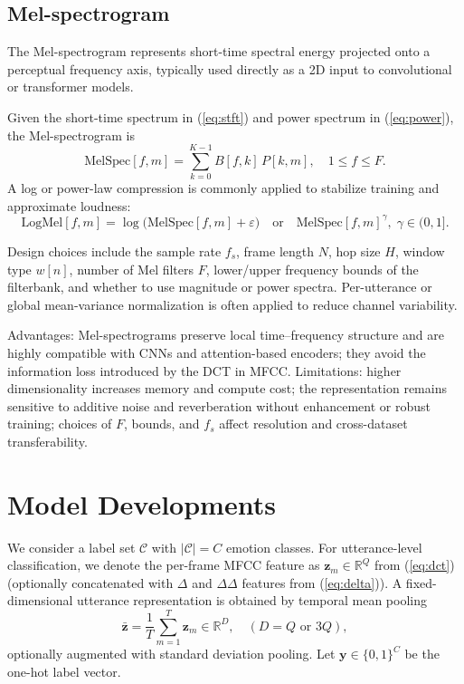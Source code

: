 \subsection{Mel-spectrogram}
The Mel-spectrogram represents short-time spectral energy projected onto a perceptual frequency axis, typically used directly as a 2D input to convolutional or transformer models.

Given the short-time spectrum in (\ref{eq:stft}) and power spectrum in (\ref{eq:power}), the Mel-spectrogram is
\begin{equation}\label{eq:melspec}
\mathrm{MelSpec}[f,m] = \sum_{k=0}^{K-1} B[f,k] \, P[k,m], \quad 1 \le f \le F.
\end{equation}
A log or power-law compression is commonly applied to stabilize training and approximate loudness:
\begin{equation}\label{eq:logmelspec}
\mathrm{LogMel}[f,m] = \log\big( \mathrm{MelSpec}[f,m] + \varepsilon \big) \quad \text{or} \quad \mathrm{MelSpec}[f,m]^{\gamma},\; \gamma\in(0,1].
\end{equation}

Design choices include the sample rate \(f_s\), frame length \(N\), hop size \(H\), window type \(w[n]\), number of Mel filters \(F\), lower/upper frequency bounds of the filterbank, and whether to use magnitude or power spectra. Per-utterance or global mean-variance normalization is often applied to reduce channel variability.

Advantages: Mel-spectrograms preserve local time–frequency structure and are highly compatible with CNNs and attention-based encoders; they avoid the information loss introduced by the DCT in MFCC. Limitations: higher dimensionality increases memory and compute cost; the representation remains sensitive to additive noise and reverberation without enhancement or robust training; choices of \(F\), bounds, and \(f_s\) affect resolution and cross-dataset transferability.

\section{Model Developments}

We consider a label set \(\mathcal{C}\) with \(|\mathcal{C}|=C\) emotion classes. For utterance-level classification, we denote the per-frame MFCC feature as \(\mathbf{z}_m \in \mathbb{R}^{Q}\) from (\ref{eq:dct}) (optionally concatenated with \(\Delta\) and \(\Delta\!\Delta\) features from (\ref{eq:delta})). A fixed-dimensional utterance representation is obtained by temporal mean pooling
\begin{equation}\label{eq:meanpool}
\bar{\mathbf{z}} = \frac{1}{T} \sum_{m=1}^{T} \mathbf{z}_m \in \mathbb{R}^{D}, \quad (D=Q \text{ or } 3Q),
\end{equation}
optionally augmented with standard deviation pooling. Let \(\mathbf{y} \in \{0,1\}^{C}\) be the one-hot label vector.

